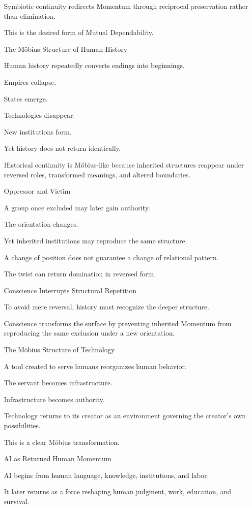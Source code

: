 Symbiotic continuity redirects Momentum through reciprocal preservation rather than elimination.

This is the desired form of Mutual Dependability.

The Möbius Structure of Human History

Human history repeatedly converts endings into beginnings.

Empires collapse.

States emerge.

Technologies disappear.

New institutions form.

Yet history does not return identically.

Historical continuity is Möbius-like because inherited structures reappear under reversed roles, transformed meanings, and altered boundaries.

Oppressor and Victim

A group once excluded may later gain authority.

The orientation changes.

Yet inherited institutions may reproduce the same structure.

A change of position does not guarantee a change of relational pattern.

The twist can return domination in reversed form.

Conscience Interrupts Structural Repetition

To avoid mere reversal, history must recognize the deeper structure.

Conscience transforms the surface by preventing inherited Momentum from reproducing the same exclusion under a new orientation.

The Möbius Structure of Technology

A tool created to serve humans reorganizes human behavior.

The servant becomes infrastructure.

Infrastructure becomes authority.

Technology returns to its creator as an environment governing the creator’s own possibilities.

This is a clear Möbius transformation.

AI as Returned Human Momentum

AI begins from human language, knowledge, institutions, and labor.

It later returns as a force reshaping human judgment, work, education, and survival.

